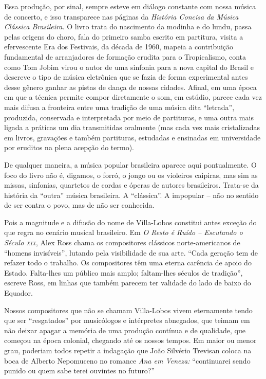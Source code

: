 \documentclass[11pt]{extarticle}
\begin{document}
Essa produção, por sinal, sempre esteve em diálogo constante com nossa
música de concerto, e isso transparece nas páginas da \emph{História
Concisa da Música Clássica Brasileira.} O livro trata do nascimento da
modinha e do lundu, passa pelas origens do choro, fala do primeiro samba
escrito em partitura, visita a efervescente Era dos Festivais, da década
de 1960, mapeia a contribuição fundamental de arranjadores de formação
erudita para o Tropicalismo, conta como Tom Jobim virou o autor de uma
sinfonia para a nova capital do Brasil e descreve o tipo de música
eletrônica que se fazia de forma experimental antes desse gênero ganhar
as pistas de dança de nossas cidades. Afinal, em uma época em que a
técnica permite compor diretamente o som, em estúdio, parece cada vez
mais difusa a fronteira entre uma tradição de uma música dita
``letrada'', produzida, conservada e interpretada por meio de
partituras, e uma outra mais ligada a práticas um dia transmitidas
oralmente (mas cada vez mais cristalizadas em livros, gravações e também
partituras, estudadas e ensinadas em universidade por eruditos na plena
acepção do termo).

De qualquer maneira, a música popular brasileira aparece aqui
pontualmente. O foco do livro não é, digamos, o forró, o jongo ou os
violeiros caipiras, mas sim as missas, sinfonias, quartetos de cordas e
óperas de autores brasileiros. Trata-se da história da ``outra'' música
brasileira. A ``clássica''. A impopular -- não no sentido de ser contra
o povo, mas de não ser conhecida.

Pois a magnitude e a difusão do nome de Villa-Lobos constitui antes
exceção do que regra no cenário musical brasileiro. Em \emph{O Resto é
Ruído -- Escutando o Século \textsc{xix}}, Alex Ross chama os compositores
clássicos norte-americanos de ``homens invisíveis'', lutando pela
visibilidade de sua arte. ``Cada geração tem de refazer todo o trabalho.
Os compositores têm uma eterna carência de apoio do Estado. Falta-lhes
um público mais amplo; faltam-lhes séculos de tradição'', escreve Ross,
em linhas que também parecem ter validade do lado de baixo do Equador.

Nossos compositores que não se chamam Villa-Lobos vivem eternamente
tendo que ser ``resgatados'' por musicólogos e intérpretes abnegados,
que teimam em não deixar apagar a memória de uma produção contínua e de
qualidade, que começou na época colonial, chegando até os nossos tempos.
Em maior ou menor grau, poderiam todos repetir a indagação que João
Silvério Trevisan coloca na boca de Alberto Nepomuceno no romance
\emph{Ana em Veneza:} ``continuarei sendo punido ou quem sabe terei
ouvintes no futuro?''
\end{document}
